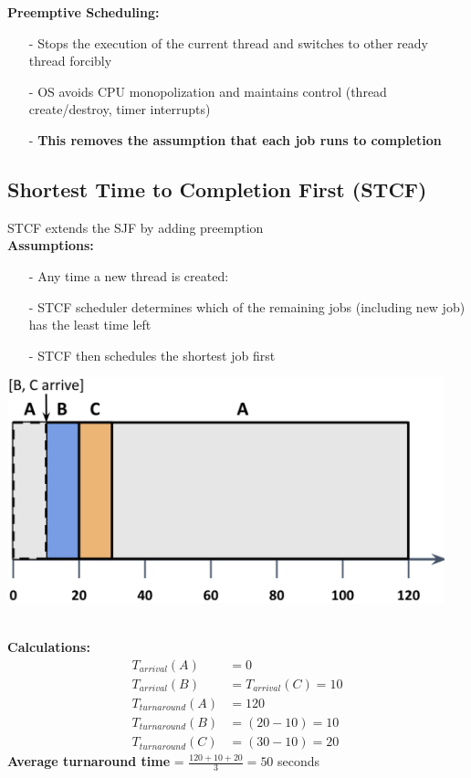\documentclass[../../compsys.tex]{subfiles}
\begin{document}
\textbf{Preemptive Scheduling:}\\[5px]
\begin{itemize}
    \item[-] Stops the execution of the current thread and switches to other ready thread forcibly
    \item[-] OS avoids CPU monopolization and maintains control (thread create/destroy, timer interrupts)
    \item[-] \textbf{This removes the assumption that each job runs to completion}
\end{itemize}
\newpage
\subsection{Shortest Time to Completion First (STCF)}
STCF extends the SJF by adding preemption\\
\textbf{Assumptions:}\\[5px]
\begin{minipage}[htp]{0.45\textwidth}
\begin{itemize}
    \item[-] Any time a new thread is created:
    \item[-] STCF scheduler determines which of the remaining jobs (including new job) has the least time left
    \item[-] STCF then schedules the shortest job first
\end{itemize}
\end{minipage}
\hfill
\begin{minipage}[htp]{0.45\textwidth}
    \centering
    \includegraphics[width=0.95\textwidth]{images/stcf.png}
\end{minipage}\\[5px]
\textbf{Calculations:}\\[5px]
\begin{align*}
    T_{arrival}(A) &= 0 \\
    T_{arrival}(B) &= T_{arrival}(C) = 10 \\
    T_{turnaround}(A) &= 120 \\
    T_{turnaround}(B) &= (20 - 10) = 10 \\
    T_{turnaround}(C) &= (30 - 10) = 20
\end{align*}
\textbf{Average turnaround time} = $\frac{120 + 10 + 20}{3} = 50$ seconds \\[3px]
\end{document}
